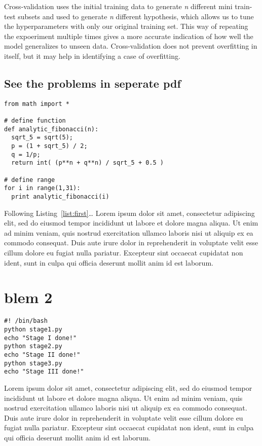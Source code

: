 \documentclass[a4paper,11pt]{article}
\theoremstyle{mytheor}
\begin{document}
Cross-validation uses the initial training data to generate \textit{n} different mini train-test subsets and used to generate \textit{n} different hypothesis, which allows us to tune the hyperparameters with only our original training set. This way of repeating the expoeriment multiple times gives a more accurate indication of how well the model generalizes to unseen data. Cross-validation does not prevent overfitting in itself, but it may help in identifying a case of overfitting.

\subsection{See the problems in seperate pdf}




\begin{lstlisting}[label={list:first},caption=Sample Python code -- Fibonacci sequence calculated analytically.]
from math import *

# define function 
def analytic_fibonacci(n):
  sqrt_5 = sqrt(5);
  p = (1 + sqrt_5) / 2;
  q = 1/p;
  return int( (p**n + q**n) / sqrt_5 + 0.5 )
 
# define range
for i in range(1,31):
  print analytic_fibonacci(i)
\end{lstlisting}

Following Listing~\ref{list:first}\ldots{} 
Lorem ipsum dolor sit amet, consectetur adipiscing elit, sed do eiusmod tempor incididunt ut labore et dolore magna aliqua. Ut enim ad minim veniam, quis nostrud exercitation ullamco laboris nisi ut aliquip ex ea commodo consequat. Duis aute irure dolor in reprehenderit in voluptate velit esse cillum dolore eu fugiat nulla pariatur. Excepteur sint occaecat cupidatat non ident, sunt in culpa qui officia deserunt mollit anim id est laborum.

\section*{blem 2}

\begin{lstlisting}[label={list:second},caption=Sample Bash code.]
#! /bin/bash
python stage1.py
echo "Stage I done!"
python stage2.py
echo "Stage II done!"
python stage3.py
echo "Stage III done!"
\end{lstlisting}

Lorem ipsum dolor sit amet, consectetur adipiscing elit, sed do eiusmod tempor incididunt ut labore et dolore magna aliqua. Ut enim ad minim veniam, quis nostrud exercitation ullamco laboris nisi ut aliquip ex ea commodo consequat. Duis aute irure dolor in reprehenderit in voluptate velit esse cillum dolore eu fugiat nulla pariatur. Excepteur sint occaecat cupidatat non ident, sunt in culpa qui officia deserunt mollit anim id est laborum.
\end{document}
